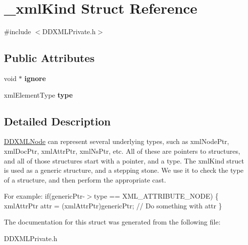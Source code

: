 \hypertarget{struct__xml_kind}{}\section{\+\_\+xml\+Kind Struct Reference}
\label{struct__xml_kind}


{\ttfamily \#include $<$D\+D\+X\+M\+L\+Private.\+h$>$}

\subsection*{Public Attributes}
\begin{DoxyCompactItemize}
\item 
\hypertarget{struct__xml_kind_a68696d3e1766674f6484969c00dcbaae}{}void $\ast$ {\bfseries ignore}\label{struct__xml_kind_a68696d3e1766674f6484969c00dcbaae}

\item 
\hypertarget{struct__xml_kind_a41b217705b818e9d32f2ee1b8db78bd7}{}xml\+Element\+Type {\bfseries type}\label{struct__xml_kind_a41b217705b818e9d32f2ee1b8db78bd7}

\end{DoxyCompactItemize}


\subsection{Detailed Description}
\hyperlink{interface_d_d_x_m_l_node}{D\+D\+X\+M\+L\+Node} can represent several underlying types, such as xml\+Node\+Ptr, xml\+Doc\+Ptr, xml\+Attr\+Ptr, xml\+Ns\+Ptr, etc. All of these are pointers to structures, and all of those structures start with a pointer, and a type. The xml\+Kind struct is used as a generic structure, and a stepping stone. We use it to check the type of a structure, and then perform the appropriate cast.

For example\+: if(generic\+Ptr-\/$>$type == X\+M\+L\+\_\+\+A\+T\+T\+R\+I\+B\+U\+T\+E\+\_\+\+N\+O\+D\+E) \{ xml\+Attr\+Ptr attr = (xml\+Attr\+Ptr)generic\+Ptr; // Do something with attr \} 

The documentation for this struct was generated from the following file\+:\begin{DoxyCompactItemize}
\item 
D\+D\+X\+M\+L\+Private.\+h\end{DoxyCompactItemize}
